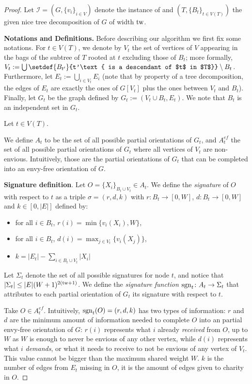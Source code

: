 \begin{proof}
    Let $\mathcal{I} = (G,\{v_i\}_{i\in V})$ denote the instance of {\EFmc}
    and $(T,\{B_t\}_{t\in V(T)})$ the given nice tree decomposition of $G$ of width $\mathrm{tw}$.


    \textbf{Notations and Definitions.}
    Before describing our algorithm we first fix some notations.
    For $t \in V(T)$, we denote by $V_t$ the set of vertices of $V$ appearing in the bags of the subtree of $T$ rooted at $t$
    excluding those of $B_t$;
    more formally, $V_t := \bigcup\setdef{B_{t'}}{t'\text{ is a descendant of $t$ in $T$}} \setminus B_t$.
    Furthermore, let $E_t:=\bigcup_{i\in V_t}E_i$
    (note that by property of a tree decomposition, the edges of $E_t$ are exactly the ones of $G[V_t]$ plus the ones between $V_t$ and $B_t$).
    Finally, let $G_t$ be the graph defined by $G_t:=(V_t\cup B_t,E_t)$. We note that $B_t$ is an independent set in $G_t$.

    Let $t\in V(T)$.

    We define $A_t$ to be the set of all possible partial orientations of $G_t$, and $A^{ef}_t$ the set of all possible partial orientations of $G_t$ where all vertices of $V_t$ are non-envious. Intuitively, those are the partial orientations of $G_t$ that can be completed into an envy-free orientation of $G$.

    \textbf{Signature definition}. Let $O=\{X_i\}_{B_t\cup V_t}\in A_t$. We define the \emph{signature} of $O$ with respect to $t$
    as a triple $\sigma=(r,d,k)$ with $r\colon B_t \to [ 0,W ]$, $d\colon B_t \to [ 0,W ]$ and $k\in [0,|E|]$ defined by:
    \begin{itemize}
        \item for all $i\in B_t$, $r(i)= \min\{ v_{i} (X_{i}),W \}$,
        \item for all $i\in B_t$, $d(i)=\max_{j\in V_t}\{v_i(X_j)\}$,
        \item $k=|E_t|-\sum_{i\in B_t\cup V_t}|X_i|$
    \end{itemize}

    Let $\Sigma_t$ denote the set of all possible signatures for node $t$, and notice that $|\Sigma_t| \le |E|(W+1)^{2(\mathrm{tw}+1)}$.
    We define the \emph{signature function} $\operatorname{sgn}_t \colon A_t \to \Sigma_t$ that attributes to each partial orientation of $G_t$ its signature with respect to $t$.

    Take $O\in A_t^{ef}$. Intuitively, $\operatorname{sgn}_t(O)=(r,d,k)$ has two types of information: $r$ and $d$ are the minimum amount of information needed to complete $O$ into an partial envy-free orientation of $G$: $r(i)$ represents what $i$ already \emph{received} from $O$, up to $W$ as $W$ is enough to never be envious of any other vertex, while $d(i)$ represents what $i$ \emph{demands}, or what it needs to receive to not be envious of any vertex of $V_t$. This value cannot be bigger than the maximum shared weight $W$. $k$ is the number of edges from $E_t$ missing in $O$, it is the amount of edges given to charity in $O$.


\end{proof}
